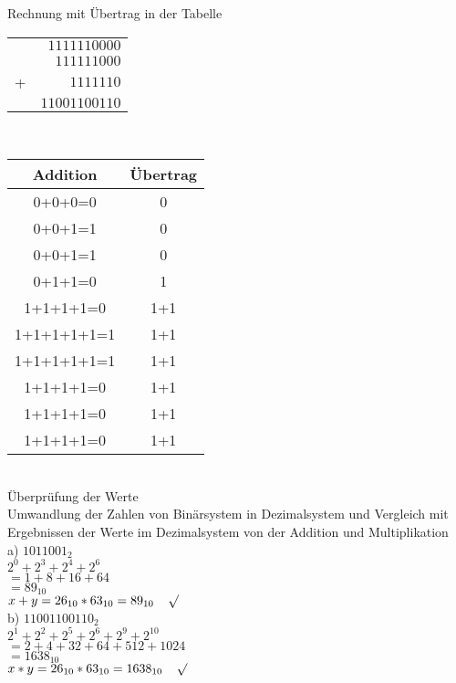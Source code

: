 \documentclass[paper=a4, fontsize=11pt]{scrartcl}
\numberwithin{equation}{section}
\numberwithin{figure}{section}
\numberwithin{table}{section}
\begin{document}
Rechnung mit Übertrag in der Tabelle\\

\begin{tabular}{cr}
	&$ 1111 1100 00$	\\
	&$ 1111 1100 0$	\\
   +&$ 1111 110$	\\\hline 
	&$ 11001100110$
\end{tabular}
\\

  \begin{tabular}{|c|c|}
  \hline
Addition & Übertrag\\
  \hline
0+0+0=0 & 0 \\
  \hline
0+0+1=1 & 0 \\
  \hline
0+0+1=1 & 0 \\
  \hline
0+1+1=0 & 1 \\
  \hline
1+1+1+1=0 & 1+1 \\
  \hline
1+1+1+1+1=1 & 1+1 \\
  \hline
1+1+1+1+1=1 & 1+1 \\
  \hline
1+1+1+1=0 & 1+1\\
  \hline
1+1+1+1=0 & 1+1 \\
  \hline
1+1+1+1=0 & 1+1 \\
  \hline
  \end{tabular} \\

Überprüfung der Werte \\
Umwandlung der Zahlen von Binärsystem in Dezimalsystem und Vergleich mit Ergebnissen der Werte im Dezimalsystem von der Addition und Multiplikation \\


a) $1011001_{2}$\\
$2^{0}+2^{3}+2^{4}+2^{6}$\\
$=1+8+16+64$\\
$=89_{10}$\\

$ x+y= 26_{10}*63_{10} = 89_{10} \:\:\:\:\: \surd$ \\


b) $11001100110_{2}$\\
$2^{1}+2^{2}+2^{5}+2^{6}+2^{9}+2^{10}$\\
$=2+4+32+64+512+1024$\\
$=1638_{10}$\\

$ x*y= 26_{10}*63_{10} =1638_{10} \:\:\:\:\: \surd$ \\
\end{document}
